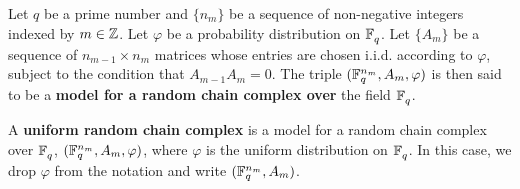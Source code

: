 


\begin{definition}
  Let $q$ be a prime number and $\{n_m\}$ be a sequence of non-negative integers indexed by $m \in \mathbb{Z}$. Let $\varphi$ be a probability distribution on $\mathbb{F}_q^{}$. Let $\{A_m\}$ be a sequence of $n_{m-1}\times n_{m}$ matrices whose entries are chosen i.i.d. according to $\varphi$, subject to the condition that $A_{m-1}A_m = 0$.  The triple $(\mathbb{F}_q^{n_m},A_m,\varphi)$ is then said to be a {\bf  model for a random chain complex over} the field $\mathbb{F}_q^{}$.
\end{definition}





\begin{definition}
  A {\bf uniform random chain complex} is a model for a random chain complex over $\mathbb{F}_q^{}$, $(\mathbb{F}_q^{n_m},A_m,\varphi)$, where $\varphi$ is the uniform distribution on $\mathbb{F}_q^{}$. In this case, we drop $\varphi$ from the notation and write $(\mathbb{F}_q^{n_m}, A_m)$.
  \label{defn:random_chain_cx}
\end{definition}

